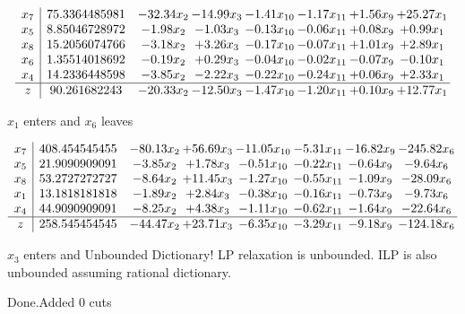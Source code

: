 \documentclass[8pt]{article}
\begin{document}
 \[\begin{array}{c| c c@{\hskip 2pt} c@{\hskip 2pt} c@{\hskip 2pt} c@{\hskip 2pt} c@{\hskip 2pt} c@{\hskip 2pt} }
 x_{7}   &  75.3364485981 & -32.34 x_{2} & -14.99 x_{3} & -1.41 x_{10} & -1.17 x_{11} & +  1.56 x_{9} & + 25.27 x_{1}\\
 x_{5}   &  8.85046728972 & -1.98 x_{2} & -1.03 x_{3} & -0.13 x_{10} & -0.06 x_{11} & +  0.08 x_{9} & +  0.99 x_{1}\\
 x_{8}   &  15.2056074766 & -3.18 x_{2} & +  3.26 x_{3} & -0.17 x_{10} & -0.07 x_{11} & +  1.01 x_{9} & +  2.89 x_{1}\\
 x_{6}   &  1.35514018692 & -0.19 x_{2} & +  0.29 x_{3} & -0.04 x_{10} & -0.02 x_{11} & -0.07 x_{9} & -0.10 x_{1}\\
 x_{4}   &  14.2336448598 & -3.85 x_{2} & -2.22 x_{3} & -0.22 x_{10} & -0.24 x_{11} & +  0.06 x_{9} & +  2.33 x_{1}\\
\hline
z    &  90.261682243 & -20.33 x_{2} & -12.50 x_{3} & -1.47 x_{10} & -1.20 x_{11} & +  0.10 x_{9} & + 12.77 x_{1}\\
\end{array}\]


 $ x_{1} $ enters and $ x_{6} $ leaves 

 \[\begin{array}{c| c c@{\hskip 2pt} c@{\hskip 2pt} c@{\hskip 2pt} c@{\hskip 2pt} c@{\hskip 2pt} c@{\hskip 2pt} }
 x_{7}   &  408.454545455 & -80.13 x_{2} & + 56.69 x_{3} & -11.05 x_{10} & -5.31 x_{11} & -16.82 x_{9} & -245.82 x_{6}\\
 x_{5}   &  21.9090909091 & -3.85 x_{2} & +  1.78 x_{3} & -0.51 x_{10} & -0.22 x_{11} & -0.64 x_{9} & -9.64 x_{6}\\
 x_{8}   &  53.2727272727 & -8.64 x_{2} & + 11.45 x_{3} & -1.27 x_{10} & -0.55 x_{11} & -1.09 x_{9} & -28.09 x_{6}\\
 x_{1}   &  13.1818181818 & -1.89 x_{2} & +  2.84 x_{3} & -0.38 x_{10} & -0.16 x_{11} & -0.73 x_{9} & -9.73 x_{6}\\
 x_{4}   &  44.9090909091 & -8.25 x_{2} & +  4.38 x_{3} & -1.11 x_{10} & -0.62 x_{11} & -1.64 x_{9} & -22.64 x_{6}\\
\hline
z    &  258.545454545 & -44.47 x_{2} & + 23.71 x_{3} & -6.35 x_{10} & -3.29 x_{11} & -9.18 x_{9} & -124.18 x_{6}\\
\end{array}\]


 $ x_{3} $ enters and Unbounded Dictionary!
 LP relaxation is unbounded. ILP is also unbounded assuming rational dictionary. 

Done.Added 0 cuts 
\end{document}
